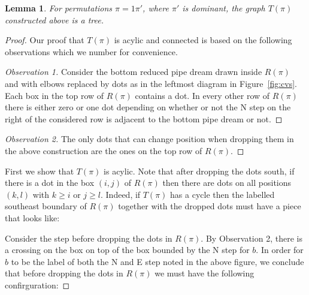 \documentclass[10pt]{amsart}
\newtheorem{lemm}[theo]{Lemma}
\theoremstyle{definition}
\numberwithin{equation}{section}
\newcommand*\+{\smash{\lower2pt\hbox{\rlap{\vrule height14pt}}\raise2pt\hbox{\rlap{\hskip-3pt \vrule height.4pt depth0pt width14.7pt}}}}
\begin{document}
\begin{lemm}
For permutations $\pi=1\pi'$, where $\pi'$ is dominant, the graph $T(\pi)$ constructed above is a tree.
\end{lemm}

\begin{proof}
Our proof that $T(\pi)$ is acylic and connected is based on the following observations which we number for convenience.

\begin{proof}[Observation 1]
Consider the bottom reduced pipe dream drawn inside $R(\pi)$ and with elbows replaced by dots as in the leftmost diagram in Figure~\ref{fig:cvs}. Each box in the top row of $R(\pi)$ contains a dot. In every other row of $R(\pi)$ there is either zero or one dot depending on whether or not the N step on the right of the considered row is adjacent to the bottom pipe dream or not.
\let\qed\relax
\end{proof}

\begin{proof}[Observation 2]
The only dots that can change position when dropping them in the above construction are the ones on the top row of $R(\pi)$.
\let\qed\relax
\end{proof}

First we show that $T(\pi)$ is acylic. Note that after dropping the dots south, if there is a dot in the box $(i,j)$ of $R(\pi)$ then there are dots on all positions $(k,l)$ with $k\ge i$ or $j\ge l$. Indeed, if $T(\pi)$ has a cycle then the labelled southeast boundary of $R(\pi)$ together with the dropped dots must have a piece that looks like:
\begin{center}
\end{center}

Consider the step before dropping the dots in $R(\pi)$. By {Observation 2}, there is a crossing on the box on top of the box bounded by the N step for $b$. In order for $b$ to be the label of both the N and E step noted in the above figure, we conclude that before dropping the dots in $R(\pi)$ we must have the following confirguration:


\end{proof}
\end{document}
